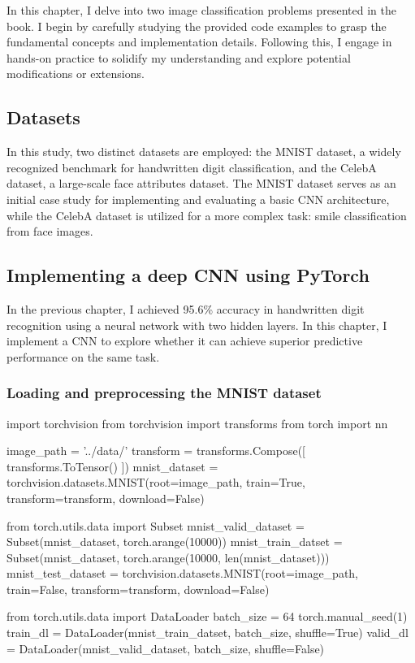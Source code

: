 In this chapter, I delve into two image classification problems presented in the book. I begin by carefully studying the provided code examples to grasp the fundamental concepts and implementation details. Following this, I engage in hands-on practice to solidify my understanding and explore potential modifications or extensions.
\subsection{Datasets}
In this study, two distinct datasets are employed: the MNIST dataset, a widely recognized benchmark for handwritten digit classification, and the CelebA dataset, a large-scale face attributes dataset. The MNIST dataset serves as an initial case study for implementing and evaluating a basic CNN architecture, while the CelebA dataset is utilized for a more complex task: smile classification from face images.

\subsection{Implementing a deep CNN using PyTorch}
In the previous chapter, I achieved 95.6\% accuracy in handwritten digit recognition using a neural network with two hidden layers. In this chapter, I implement a CNN to explore whether it can achieve superior predictive performance on the same task.
\subsubsection{Loading and preprocessing the MNIST dataset}
\begin{pythoncode}
import torchvision
from torchvision import transforms
from torch import nn

image_path = '../data/'
transform = transforms.Compose([
    transforms.ToTensor()
])
mnist_dataset = torchvision.datasets.MNIST(root=image_path, train=True, transform=transform, download=False)

from torch.utils.data import Subset
mnist_valid_dataset = Subset(mnist_dataset, torch.arange(10000))
mnist_train_datset = Subset(mnist_dataset, torch.arange(10000, len(mnist_dataset)))
mnist_test_dataset = torchvision.datasets.MNIST(root=image_path, train=False, transform=transform, download=False)

from torch.utils.data import DataLoader
batch_size = 64
torch.manual_seed(1)
train_dl = DataLoader(mnist_train_datset, batch_size, shuffle=True)
valid_dl = DataLoader(mnist_valid_dataset, batch_size, shuffle=False)
\end{pythoncode}

